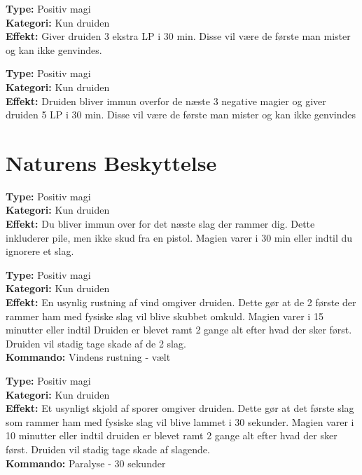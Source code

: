 \begin{mkær*}
\textbf{Type:} Positiv magi\\ 
\textbf{Kategori:} Kun druiden\\
\textbf{Effekt:} Giver druiden 3 ekstra LP i 30 min. Disse vil være de første man mister og kan ikke genvindes.
\end{mkær*}

\begin{mkær*}
\textbf{Type:} Positiv magi\\
\textbf{Kategori:} Kun druiden\\
\textbf{Effekt:} Druiden bliver immun overfor de næste 3 negative magier og giver druiden 5 LP i 30 min. Disse vil være de første man mister og kan ikke genvindes
\end{mkær*}

\section{Naturens Beskyttelse}

\begin{nbesk*}[Sandhud]
\textbf{Type:} Positiv magi\\ 
\textbf{Kategori:} Kun druiden\\
\textbf{Effekt:} Du bliver immun over for det næste slag der rammer dig. Dette inkluderer pile, men ikke skud fra en pistol. Magien varer i 30 min eller indtil du ignorere et slag.
\end{nbesk*}

\begin{nbesk*}
\textbf{Type:} Positiv magi\\
\textbf{Kategori:} Kun druiden\\
\textbf{Effekt:} En usynlig rustning af vind omgiver druiden. Dette gør at de 2 første der rammer ham med fysiske slag vil blive skubbet omkuld. Magien varer i 15 minutter eller indtil Druiden er blevet ramt 2 gange alt efter hvad der sker først. Druiden vil stadig tage skade af de 2 slag.\\
\textbf{Kommando:} Vindens rustning - vælt
\end{nbesk*}

\begin{nbesk*}
\textbf{Type:} Positiv magi\\ 
\textbf{Kategori:} Kun druiden\\
\textbf{Effekt:} Et usynligt skjold af sporer omgiver druiden. Dette gør at det første slag som rammer ham med fysiske slag vil blive lammet i 30 sekunder. Magien varer i 10 minutter eller indtil druiden er blevet ramt 2 gange alt efter hvad der sker først. Druiden vil stadig tage skade af slagende.\\
\textbf{Kommando:} Paralyse - 30 sekunder
\end{nbesk*}

